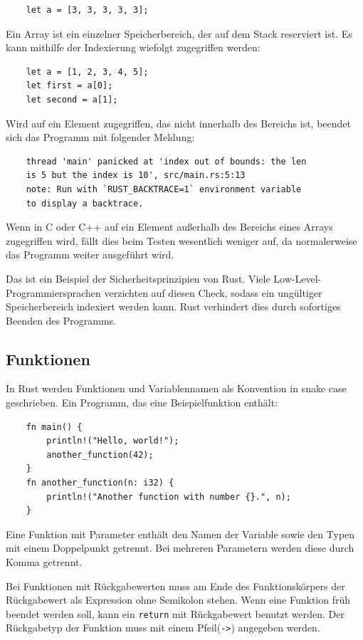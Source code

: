 \begin{lstlisting}
    let a = [3, 3, 3, 3, 3];
\end{lstlisting}

Ein Array ist ein einzelner Speicherbereich, der auf dem Stack reserviert ist. Es kann mithilfe der Indexierung wiefolgt zugegriffen werden:

\begin{lstlisting}
    let a = [1, 2, 3, 4, 5];
    let first = a[0];
    let second = a[1];
\end{lstlisting}

Wird auf ein Element zugegriffen, das nicht innerhalb des Bereichs ist, beendet sich das Programm mit folgender Meldung:

\begin{lstlisting}
    thread 'main' panicked at 'index out of bounds: the len
    is 5 but the index is 10', src/main.rs:5:13
    note: Run with `RUST_BACKTRACE=1` environment variable
    to display a backtrace.
\end{lstlisting}

Wenn in C oder C++ auf ein Element außerhalb des Bereichs eines Arrays zugegriffen wird, fällt dies beim Testen wesentlich weniger auf, da normalerweise das Programm weiter ausgeführt wird.

Das ist ein Beispiel der Sicherheitsprinzipien von Rust. Viele Low-Level-Pro\-gram\-mier\-spra\-chen verzichten auf diesen Check, sodass ein ungültiger Speicherbereich indexiert werden kann. Rust verhindert dies durch sofortiges Beenden des Programms.

\subsection{Funktionen}

In Rust werden Funktionen und Variablennamen als Konvention in snake case geschrieben. Ein Programm, das eine Beispielfunktion enthält:

\begin{lstlisting}
    fn main() {
        println!("Hello, world!");
        another_function(42);
    }
    fn another_function(n: i32) {
        println!("Another function with number {}.", n);
    }
\end{lstlisting}

Eine Funktion mit Parameter enthält den Namen der Variable sowie den Typen mit einem Doppelpunkt getrennt. Bei mehreren Parametern werden diese durch Komma getrennt.

Bei Funktionen mit Rückgabewerten muss am Ende des Funktionskörpers der Rückgabewert als Expression ohne Semikolon stehen. Wenn eine Funktion früh beendet werden soll, kann ein \verb"return" mit Rückgabewert benutzt werden. Der Rückgabetyp der Funktion muss mit einem Pfeil(\verb"->") angegeben werden.

